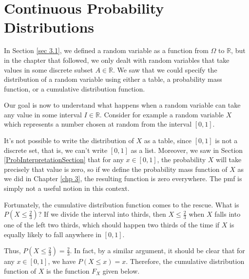 \section{Continuous Probability Distributions} \label{sec 4.1}

In Section \ref{sec 3.1}, we defined a random variable as a function from $\Omega$ to $\mathbb{R}$, but in the chapter that followed, we only dealt with random variables that take values in some discrete subset $A \in \mathbb{R}$. We saw that we could specify the distribution of a random variable using either a table, a probability mass function, or a cumulative distribution function.
\par
Our goal is now to understand what happens when a random variable can take any value in some interval $I \in \mathbb{R}$. Consider for example a random variable $X$ which represents a number chosen at random from the interval $[0,1]$.
\par
It's not possible to write the distribution of $X$ as a table, since $[0,1]$ is not a discrete set, that is, we can't write $[0,1]$ as a list. Moreover, we saw in Section \ref{ProbInterpretationSection} that for any $x \in [0,1]$, the probability $X$ will take precisely that value is zero, so if we define the probability mass function of $X$ as we did in Chapter \ref{chp 3}, the resulting function is zero everywhere. The pmf is simply not a useful notion in this context.
\par
Fortunately, the cumulative distribution function comes to the rescue. What is $P(X \leq \frac{2}{3})$? If we divide the interval into thirds, then $X \leq \frac{2}{3}$ when $X$ falls into one of the left two thirds, which should happen two thirds of the time if $X$ is equally likely to fall anywhere in $[0,1]$.
\vspace{0.5em}
\begin{center}
\end{center}
\par
Thus, $P(X \leq \frac{2}{3}) = \frac{2}{3}$. In fact, by a similar argument, it should be clear that for any $x \in [0,1]$, we have $P(X \leq x) = x$. Therefore, the cumulative distribution function of $X$ is the function $F_X$ given below.

